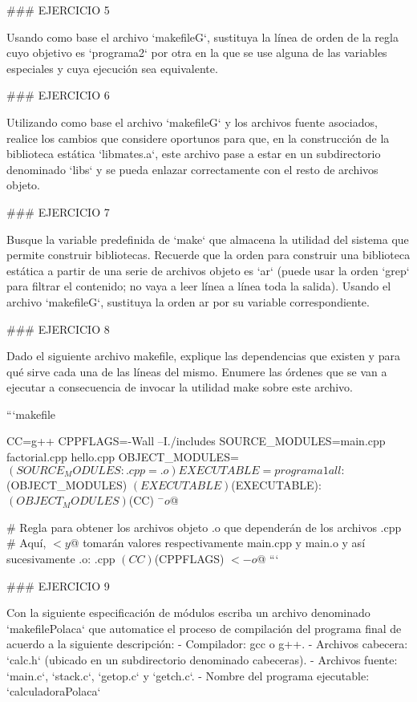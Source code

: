 ### EJERCICIO 5

Usando como base el archivo `makefileG`, sustituya la línea de orden de la regla cuyo objetivo es `programa2` por otra en la que se use alguna de las variables especiales y cuya ejecución sea equivalente.

### EJERCICIO 6

Utilizando como base el archivo `makefileG` y los archivos fuente asociados, realice los cambios que considere oportunos para que, en la construcción de la biblioteca estática `libmates.a`, este archivo pase a estar en un subdirectorio denominado `libs` y se pueda enlazar correctamente con el resto de archivos objeto.

### EJERCICIO 7

Busque la variable predefinida de `make` que almacena la utilidad del sistema que permite construir bibliotecas. Recuerde que la orden para construir una biblioteca estática a partir de una serie de archivos objeto es `ar` (puede usar la orden `grep` para filtrar el contenido; no vaya a leer línea a línea toda la salida). Usando el archivo `makefileG`, sustituya la orden ar por su variable correspondiente.

### EJERCICIO 8

Dado el siguiente archivo makefile, explique las dependencias que existen y para qué sirve cada una de las líneas del mismo. Enumere las órdenes que se van a ejecutar a consecuencia de invocar la utilidad make sobre este archivo.

```makefile

CC=g++
CPPFLAGS=-Wall –I./includes
SOURCE_MODULES=main.cpp factorial.cpp hello.cpp
OBJECT_MODULES=$(SOURCE_MODULES:.cpp=.o)
EXECUTABLE=programa1

all: $(OBJECT_MODULES) $(EXECUTABLE)

$(EXECUTABLE): $(OBJECT_MODULES)
	$(CC) $^ -o $@

# Regla para obtener los archivos objeto .o que dependerán de los archivos .cpp
# Aquí, $< y $@ tomarán valores respectivamente main.cpp y main.o y así sucesivamente
.o: .cpp
	$(CC) $(CPPFLAGS) $< -o $@
```

### EJERCICIO 9

Con la siguiente especificación de módulos escriba un archivo denominado `makefilePolaca` que automatice el proceso de compilación del programa final de acuerdo a la siguiente descripción:
- Compilador: gcc o g++.
- Archivos cabecera: `calc.h` (ubicado en un subdirectorio denominado cabeceras).
- Archivos fuente: `main.c`, `stack.c`, `getop.c` y `getch.c`.
- Nombre del programa ejecutable: `calculadoraPolaca`

